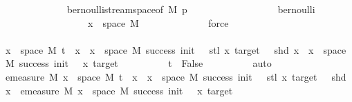 \begin{isabellebody}
\ \ \ \ \ \ \ \ \ \ \ \ \isamarkupfalse%
\ bernoulli{\isacharunderscore}{\kern0pt}stream{\isacharunderscore}{\kern0pt}space{\isacharbrackleft}{\kern0pt}of\ M\ p{\isacharbrackright}{\kern0pt}\isanewline
\ \ \ \ \ \ \ \ \ \ \ \ \ \ \ \ \ \ bernoulli\isanewline
\ \ \ \ \ \ \ \ \ \ \ \ \ \ \ \ \ \ {\isacartoucheopen}x\ {\isasymin}\ space\ M{\isacartoucheclose}\isanewline
\ \ \ \ \ \ \ \ \ \ \ \ \isamarkupfalse%
\ force\isanewline
\ \ \ \ \ \ \ \ \isamarkupfalse%
\isanewline
\ \ \ \ \ \ \isamarkupfalse%
\ \isanewline
\ \ \ \ \ \ \isamarkupfalse%
\ \isamarkupfalse%
\ {\isachardoublequoteopen}{\isacharbraceleft}{\kern0pt}x\ {\isasymin}\ space\ M{\isachardot}{\kern0pt}\ t\ {\isacharhash}{\kern0pt}{\isacharhash}{\kern0pt}\ x\ {\isasymin}\ {\isacharbraceleft}{\kern0pt}x\ {\isasymin}\ space\ M{\isachardot}{\kern0pt}\ success\ {\isacharparenleft}{\kern0pt}init\ {\isacharminus}{\kern0pt}\ {}{\isacharparenright}{\kern0pt}\ {\isacharparenleft}{\kern0pt}stl\ x{\isacharparenright}{\kern0pt}\ target\ {\isasymand}\ {\isasymnot}\ shd\ x{\isacharbraceright}{\kern0pt}{\isacharbraceright}{\kern0pt}\ {\isacharequal}{\kern0pt}\ {\isacharbraceleft}{\kern0pt}x\ {\isasymin}\ space\ M{\isachardot}{\kern0pt}\ success\ {\isacharparenleft}{\kern0pt}init\ {\isacharminus}{\kern0pt}\ {}{\isacharparenright}{\kern0pt}\ x\ target{\isacharbraceright}{\kern0pt}{\isachardoublequoteclose}\isanewline
\ \ \ \ \ \ \ \ \isamarkupfalse%
\ {\isacartoucheopen}t\ {\isacharequal}{\kern0pt}\ False{\isacartoucheclose}\isanewline
\ \ \ \ \ \ \ \ \isamarkupfalse%
\ auto\isanewline
\ \ \ \ \ \ \isamarkupfalse%
\ \isamarkupfalse%
\ {\isachardoublequoteopen}emeasure\ M\ {\isacharbraceleft}{\kern0pt}x\ {\isasymin}\ space\ M{\isachardot}{\kern0pt}\ t\ {\isacharhash}{\kern0pt}{\isacharhash}{\kern0pt}\ x\ {\isasymin}\ {\isacharbraceleft}{\kern0pt}x\ {\isasymin}\ space\ M{\isachardot}{\kern0pt}\ success\ {\isacharparenleft}{\kern0pt}init\ {\isacharminus}{\kern0pt}\ {}{\isacharparenright}{\kern0pt}\ {\isacharparenleft}{\kern0pt}stl\ x{\isacharparenright}{\kern0pt}\ target\ {\isasymand}\ {\isasymnot}\ shd\ x{\isacharbraceright}{\kern0pt}{\isacharbraceright}{\kern0pt}\ {\isacharequal}{\kern0pt}\ emeasure\ M\ {\isacharbraceleft}{\kern0pt}x\ {\isasymin}\ space\ M{\isachardot}{\kern0pt}\ success\ {\isacharparenleft}{\kern0pt}init\ {\isacharminus}{\kern0pt}\ {}{\isacharparenright}{\kern0pt}\ x\ target{\isacharbraceright}{\kern0pt}{\isachardoublequoteclose}\isanewline

\end{isabellebody}
